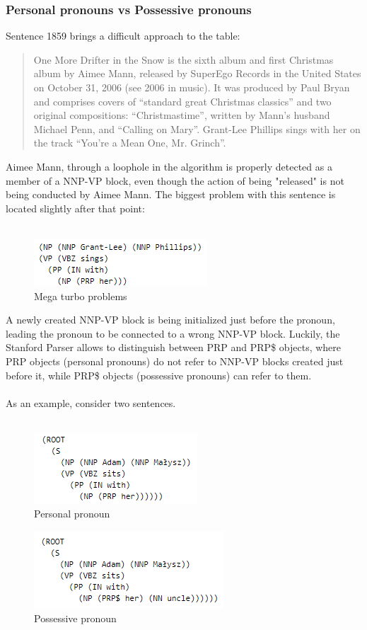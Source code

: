 \documentclass{article}
\begin{document}
\subsubsection{Personal pronouns vs Possessive pronouns}
Sentence 1859 brings a difficult approach to the table:
\begin{quote}
    One More Drifter in the Snow is the sixth album and first Christmas album by Aimee Mann, released by SuperEgo Records in the United States on October 31, 2006 (see 2006 in music). It was produced by Paul Bryan and comprises covers of ``standard great Christmas classics'' and two original compositions: ``Christmastime'', written by Mann's husband Michael Penn, and ``Calling on Mary''. Grant-Lee Phillips sings with her on the track ``You're a Mean One, Mr. Grinch''.
\end{quote}
Aimee Mann, through a loophole in the algorithm is properly detected as a member of a NNP-VP block, even though the action of being "released" is not being conducted by Aimee Mann. The biggest problem with this sentence is located slightly after that point: \\ \\
\begin{figure}[H]
    \centering
\includegraphics[]{Example6.png}
    \caption{Mega turbo problems}
\end{figure}
\noindent A newly created NNP-VP block is being initialized just before the pronoun, leading the pronoun to be connected to a wrong NNP-VP block. Luckily, the Stanford Parser allows to distinguish between PRP and PRP\$ objects, where PRP objects (personal pronouns) do not refer to NNP-VP blocks created just before it, while PRP\$ objects (possessive pronouns) can refer to them.\\ \\
As an example, consider two sentences. \\ \\
\begin{figure}[H]
    \centering
\includegraphics[]{Example7.png}
    \caption{Personal pronoun}
\end{figure}
\begin{figure}[H]
    \centering
\includegraphics[]{Example8.png}
    \caption{Possessive pronoun}
\end{figure}
\end{document}
